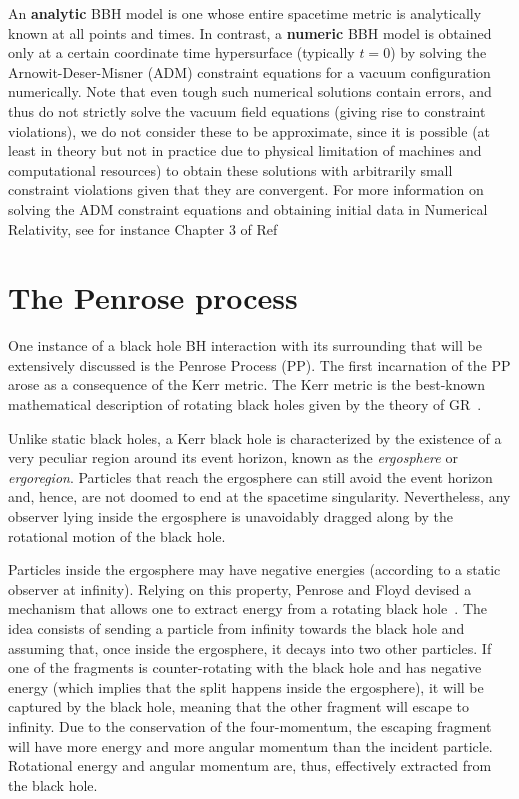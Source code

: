 \begin{definition}
  An \textbf{analytic} \ac{BBH} model is one whose entire spacetime metric is analytically known at all points and times. In contrast, a \textbf{numeric} \ac{BBH} model is obtained only at a certain coordinate time hypersurface (typically $t=0$) by solving the Arnowit-Deser-Misner (\ac{ADM}) constraint equations for a vacuum configuration numerically. Note that even tough such numerical solutions contain errors, and thus do not strictly solve the vacuum field equations (giving rise to constraint violations), we do not consider these to be approximate, since it is possible (at least in theory but not in practice due to physical limitation of machines and computational resources) to obtain these solutions with arbitrarily small constraint violations given that they are convergent. For more information on solving the \ac{ADM} constraint equations and obtaining initial data in Numerical Relativity, see for instance Chapter 3 of Ref~\cite{Alcubierre2012-xp}
\end{definition}

\section{The Penrose process}

One instance of a black hole \ac{BH} interaction with its surrounding that will be extensively discussed is the Penrose Process (\ac{PP}). The first incarnation of the \ac{PP} arose as a consequence of the Kerr metric. The Kerr metric is the best-known mathematical description of rotating black holes given by the theory of \ac{GR}~\cite{Visser:2007fj,Bambi:2011mj,Teukolsky:2014vca,berti}.

Unlike static black holes, a Kerr black hole is characterized by the existence of a very peculiar region around its event horizon, known as the \emph{ergosphere} or \emph{ergoregion}. Particles that reach the ergosphere can still avoid the event horizon and, hence, are not doomed to end at the spacetime singularity. Nevertheless, any observer lying inside the ergosphere is unavoidably dragged along by the rotational motion of the black hole.

Particles inside the ergosphere may have negative energies (according to a static observer at infinity). Relying on this property, Penrose and Floyd devised a mechanism that allows one to extract energy from a rotating black hole~\cite{PENROSE1971}. The idea consists of sending a particle from infinity towards the black hole and assuming that, once inside the ergosphere, it decays into two other particles. If one of the fragments is counter-rotating with the black hole and has negative energy (which implies that the split happens inside the ergosphere), it will be captured by the black hole, meaning that the other fragment will escape to infinity. Due to the conservation of the four-momentum, the escaping fragment will have more energy and more angular momentum than the incident particle. Rotational energy and angular momentum are, thus, effectively extracted from the black hole.

